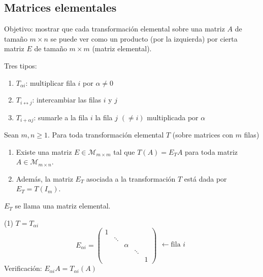 \documentclass[11pt,a4paper]{article}
\newcommand{\M}{\mathcal{M}}
\begin{document}
\subsection{Matrices elementales}

Objetivo: mostrar que cada transformación elemental sobre una matriz $A$ de tamaño $m\times n$ se puede ver como un producto (por la izquierda) por cierta matriz $E$ de tamaño $m\times m$ (matriz elemental).

Tres tipos:
\begin{enumerate}[label=(\arabic*)]
  \item $T_{\alpha i}$: multiplicar fila $i$ por $\alpha\neq0$
  \item $T_{i\leftrightarrow j}$: intercambiar las filas $i$ y $j$
  \item $T_{i+\alpha j}$: sumarle a la fila $i$ la fila $j$ $(\neq i)$ multiplicada por $\alpha$
\end{enumerate}

\begin{proposicion}
Sean $m,n\geq1$. Para toda transformación elemental $T$ (sobre matrices con $m$ filas)
\begin{enumerate}[label=(\arabic*)]
  \item Existe una matriz $E\in\M_{m\times m}$ tal que $T(A)=E_TA$ para toda matriz $A\in\M_{m\times n}$.
  \item Además, la matriz $E_T$ asociada a la transformación $T$ está dada por $E_T=T(I_m)$.
\end{enumerate}
$E_T$ se llama una matriz elemental.
\end{proposicion}

(1) $T=T_{\alpha i}$
\[
E_{\alpha i}=\begin{pmatrix}
1&&&&\\
&\ddots&&&\\
&&\alpha&&\\
&&&\ddots&\\
&&&&1
\end{pmatrix}
\begin{matrix}\\\\\leftarrow\text{fila } i\\\\\\\end{matrix}
\]
Verificación: $E_{\alpha i}A=T_{\alpha i}(A)$
\end{document}
